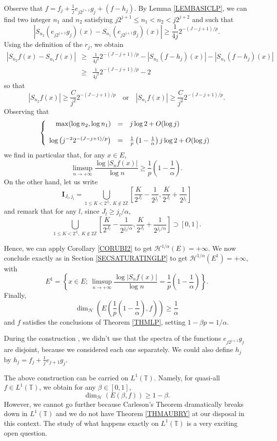 \documentclass[11pt,a4paper]{amsart}
\theoremstyle{plain}
\begin{document}
Observe that $f=f_j+\frac1je_{j2^{j+1}}g_j+(f-h_j)$. 
By Lemma \ref{LEMBASICLP}, we can find two
integer $n_1$ and $n_2$ satisfying $j2^{j+1}\le n_1< n_2< j2^{j+2}$ and such
that
$$|S_{n_2}(e_{j2^{j+1}}g_j)(x)-S_{n_1}(e_{j2^{j+1}}g_j)(x)|\ge
\frac{1}{4j}2^{-(J-j+1)/p}.$$
Using the definition of the $r_j$, we obtain
\begin{eqnarray*}
 |S_{n_2}f(x)-S_{n_1}f(x) |&\geq&\frac1{4j^2}2^{-(J-j+1)/p}-|S_{n_2}(f-h_j)(x)|-|S_{n_1}(f-h_j)(x)|\\
 &\geq&\frac{1}{4j^2}2^{-(J-j+1)/p}-2
\end{eqnarray*}
so that
$$|S_{n_2}f(x)|\ge\frac{C}{j^2}2^{-(J-j+1)/p}\quad\text{or}\quad |S_{n_1}f(x)|\ge\frac{C}{j^2}2^{-(J-j+1)/p}.$$
Observing that
$$
\left\{\begin{array}{rcl}
\max(\log n_2,\log n_1)&=&j\log 2+O(\log j)\\
\null\\
\log\left(j^{-2}2^{-(J-j+1)/p}\right)&=&\frac1p
\left(1-\frac1\alpha\right)j\log2+O(\log j)
\end{array}\right.$$
we find in particular that, for any $x\in E$,
$$\limsup_{n\to +\infty} \frac{\log |S_nf(x)|}{\log n}\geq 
\frac1p\left(1-\frac 1\alpha\right).$$
On the other hand, let us write
$$\mathbf I_{J_l,j_l}=\bigcup_{1\le K<2^{J_l},\ K\notin 2{\mathbb Z}}\left[\frac{K}{2^{J_l}}-\frac1{2^{j_l}},\frac{K}{2^{J_l}}+\frac{1}{2^{j_l}}\right]$$
and remark that for any $l$, since $J_l\geq j_l/\alpha$,
$$\bigcup_{1\le K<2^{J_l},\ K\notin 2{\mathbb Z}}\left[\frac{K}{2^{J_l}}-\frac1{2^{j_l/\alpha}},\frac{K}{2^{J_l}}+\frac{1}{2^{j_l/\alpha}}\right]\supset [0,1].$$

Hence, we can apply Corollary \ref{CORUBI2} to get $\mathcal{H}^{1/\alpha}(E)=+\infty$. We now conclude exactly as in Section \ref{SECSATURATINGLP}
to get $\mathcal{H}^{1/\alpha}(E^1)=+\infty$, with
$$E^1=\left\{x\in E;\ \limsup_{n\to +\infty} \frac{\log |S_nf(x)|}{\log n}=\frac1p\left(1-\frac1\alpha\right)\right\}.$$
Finally, 
$$\dim_\mathcal{H}\left(E\left(\frac1p\left(1-\frac{1}{\alpha}\right),f\right)\right)
\ge\frac1\alpha$$
and $f$ satisfies the conclusions of Theorem \ref{THMLP}, setting $1-\beta p=1/\alpha$.
\begin{remark}During the construction , we didn't use that the spectra
  of the functions $e_{j2^{j+1}}g_j$ are disjoint, 
because we considered each one separately. We could also define $h_j$ by $h_j=f_j+\frac 1je_{j+1}g_j$. 
\end{remark}
\begin{remark}
The above construction can be carried on $L^1({\mathbb T})$. Namely, for quasi-all
$f\in L^1({\mathbb T})$, we obtain for any $\beta\in [0,1]$, 
$$\dim_{\mathcal H}\left( E\left(\beta,f\right)\right)\geq 1-\beta .$$
However, we cannot go further because Carleson's Theorem dramatically breaks
down in $L^1({\mathbb T})$ and we do not have Theorem \ref{THMAUBRY} at our disposal in this context. 
The study of what happens exactly on $L^1({\mathbb T})$ is a very exciting open question.
\end{remark}
\end{document}
